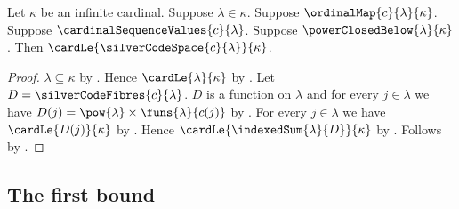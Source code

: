 \begin{theorem}\label{silver_code_space_cardinal_bound}
    Let $\kappa$ be an infinite cardinal.
    Suppose $\lambda\in\kappa$.
    Suppose $\ordinalMap{c}{\lambda}{\kappa}$.
    Suppose $\cardinalSequenceValues{c}{\lambda}$.
    Suppose $\powerClosedBelow{\lambda}{\kappa}$.
    Then $\cardLe{\silverCodeSpace{c}{\lambda}}{\kappa}$.
\end{theorem}
\begin{proof}
    $\lambda\subseteq\kappa$
        by .
    Hence $\cardLe{\lambda}{\kappa}$
        by .
    Let $D=\silverCodeFibres{c}{\lambda}$.
    $D$ is a function on $\lambda$ and
        for every $j\in\lambda$ we have
            $D(j)=\pow{\lambda}\times\funs{\lambda}{c(j)}$
        by .
    For every $j\in\lambda$ we have $\cardLe{D(j)}{\kappa}$
        by .
    Hence $\cardLe{\indexedSum{\lambda}{D}}{\kappa}$
        by .
    Follows by .
\end{proof}

\subsection{The first bound}

